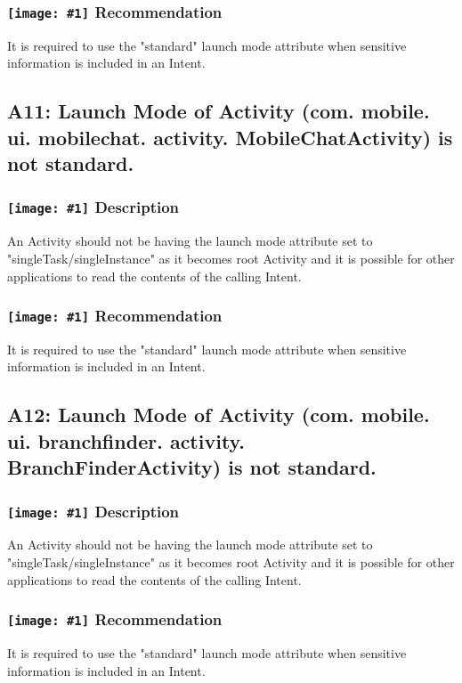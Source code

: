 \documentclass[12p]{article}
\newcommand{\icon}[1]{\texttt{[image: \#1]}}
\begin{document}
\subsubsection*{\protect\icon{/home/miki/Documents/GITHUB/AndroidPermissions/python/vulns/report_icons/basic_todo.png} Recommendation}
It is required to use the "standard" launch mode attribute when sensitive information is included in an Intent.
\subsection{A11: Launch Mode of Activity (com. mobile. ui. mobilechat. activity. MobileChatActivity) is not standard.}
\subsubsection*{\protect\icon{/home/miki/Documents/GITHUB/AndroidPermissions/python/vulns/report_icons/basic_sheet.png} Description}
An Activity should not be having the launch mode attribute set to "singleTask/singleInstance" as it becomes root Activity and it is possible for other applications to read the contents of the calling Intent.
\subsubsection*{\protect\icon{/home/miki/Documents/GITHUB/AndroidPermissions/python/vulns/report_icons/basic_todo.png} Recommendation}
It is required to use the "standard" launch mode attribute when sensitive information is included in an Intent.
\subsection{A12: Launch Mode of Activity (com. mobile. ui. branchfinder. activity. BranchFinderActivity) is not standard.}
\subsubsection*{\protect\icon{/home/miki/Documents/GITHUB/AndroidPermissions/python/vulns/report_icons/basic_sheet.png} Description}
An Activity should not be having the launch mode attribute set to "singleTask/singleInstance" as it becomes root Activity and it is possible for other applications to read the contents of the calling Intent.
\subsubsection*{\protect\icon{/home/miki/Documents/GITHUB/AndroidPermissions/python/vulns/report_icons/basic_todo.png} Recommendation}
It is required to use the "standard" launch mode attribute when sensitive information is included in an Intent.
\end{document}
